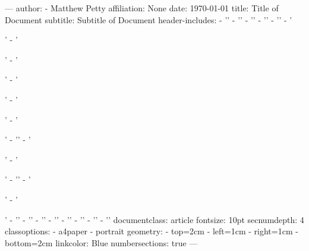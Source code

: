 ---
author:
- Matthew Petty
affiliation: None
date: \today
title: Title of Document
subtitle: Subtitle of Document
header-includes:
    - '\newcommand{\projectNumberCode}{CODE }'
    - '\newcommand{\projectName}{Project Name }'
    - '\newcommand{\coreSystemName}{Core Name }'
    - '\newcommand{\bt}[1]{\fcolorbox{gray}{lightgray}{#1}}'
    - ''
    - '\usepackage{fontawesome}'
    - '\usepackage{tocloft}'
    - '\usepackage{graphicx}'
    - '\usepackage{hyperref}'
    - '\usepackage{float}'
    - '\usepackage{glossaries}'
    - ''
    - '\usepackage{xparse}'
    - '\usepackage{lscape}'
    - '\makenoidxglossaries'
    - '\usepackage{etoolbox}'
    - '\usepackage{xstring}'
    - '\setlength{\aboverulesep}{0pt}'
    - '\setlength{\belowrulesep}{0pt}'
    - '\renewcommand{\arraystretch}{1.3}'
    - '\makeatletter'
    - ''
    - '\def\midrule{}'
    - '\apptocmd{\LT@tabularcr}{\hline}{}{}'
    - '\makeatother'
documentclass: article
fontsize: 10pt
secnumdepth: 4
classoptions:
    - a4paper
    - portrait
geometry:
- top=2cm
- left=1cm
- right=1cm
- bottom=2cm
linkcolor: Blue
numbersections: true
---

\pagebreak

\tableofcontents

\setcounter{table}{0}

\listoftables

\pagebreak
